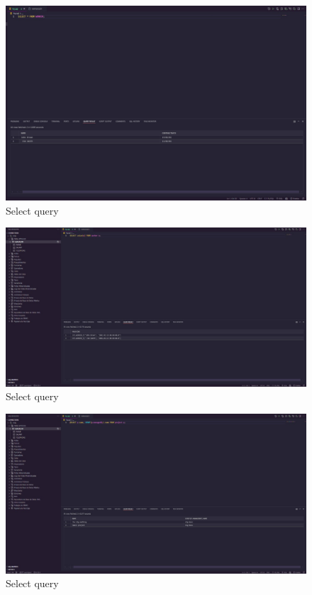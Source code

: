 \documentclass{article}
\begin{document}
\begin{figure}[H]
	\centering
	\includegraphics[width=1\textwidth]{imgs/sel1.jpeg}
	\caption{Select query}
	\label{fig:14}
\end{figure}

\begin{figure}[H]
	\centering
	\includegraphics[width=1\textwidth]{imgs/sel2.jpeg}
	\caption{Select query}
	\label{fig:15}
\end{figure}

\begin{figure}[H]
	\centering
	\includegraphics[width=1\textwidth]{imgs/sel3.jpeg}
	\caption{Select query}
	\label{fig:16}
\end{figure}
\end{document}
